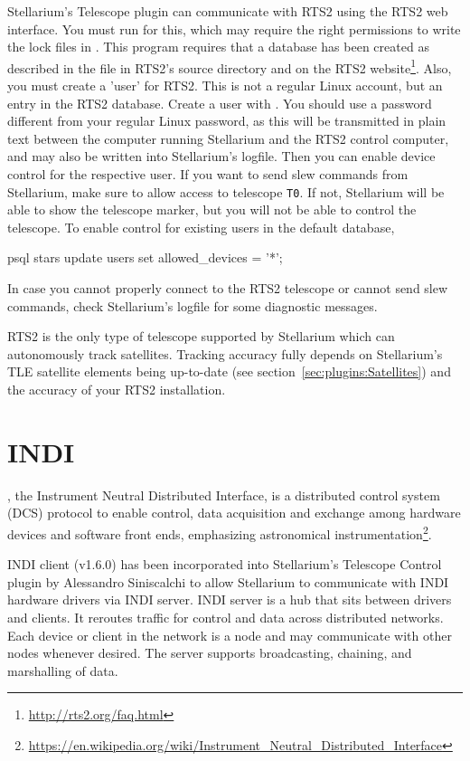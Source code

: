 Stellarium's Telescope plugin can communicate with RTS2 using the RTS2 web interface. You must run  for this, 
which may require the right permissions to write the lock files in . This program requires 
that a database has been created as described in the file  in RTS2's source directory and on the RTS2 website\footnote{\url{http://rts2.org/faq.html}}.   
Also, you must create a 'user' for RTS2. This is not a regular Linux account, but an entry in the RTS2 database. 
Create a user with . You should use a password different from your regular Linux password, 
as this will be transmitted in plain text between the computer running Stellarium and the RTS2 control computer, 
and may also be written into Stellarium's logfile. Then you can enable device control for the respective user. 
If you want to send slew commands from Stellarium, make sure to allow access to telescope \texttt{T0}. 
If not, Stellarium will be able to show the telescope marker, but you will not be able to control the telescope. 
To enable control for existing users in the default  database, 
\begin{commands}
psql stars
update users set allowed_devices = '*';
\end{commands}

In case you cannot properly connect to the RTS2 telescope or cannot send slew commands, 
check Stellarium's logfile  for some diagnostic messages.

RTS2 is the only type of telescope supported by Stellarium which can autonomously track satellites. 
Tracking accuracy fully depends on Stellarium's TLE satellite elements being up-to-date 
(see section~\ref{sec:plugins:Satellites}) and the accuracy of your RTS2 installation.

\section{INDI}
\label{sec:plugins:TelescopeControl:INDI}
, the Instrument Neutral Distributed Interface, 
is a distributed control system (DCS) protocol to enable control, data acquisition 
and exchange among hardware devices and software front ends, emphasizing astronomical 
instrumentation\footnote{\url{https://en.wikipedia.org/wiki/Instrument_Neutral_Distributed_Interface}}.
 
INDI client (v1.6.0) has been incorporated into Stellarium's Telescope Control plugin 
by Alessandro Siniscalchi to allow Stellarium to communicate with INDI hardware drivers via INDI server. 
INDI server is a hub that sits between drivers and clients. It reroutes traffic for control and data across distributed networks. 
Each device or client in the network is a node and may communicate with other nodes whenever desired. 
The server supports broadcasting, chaining, and marshalling of data.


